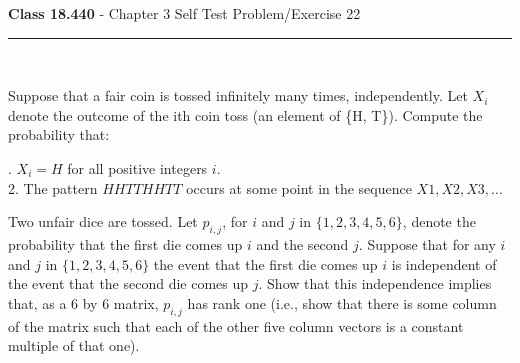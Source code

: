 \documentclass[11pt,reqno]{article}
\begin{document}
\vspace{15pt}
\begin{flushleft} 
\textbf{Class 18.440} - Chapter 3 Self Test Problem/Exercise 22\\
\rule{500pt}{1pt}\\
\end{flushleft} 


\noindent {} \par

Suppose that a fair coin is tossed infinitely many times, independently. Let $X_i$ denote the outcome of the ith coin toss (an element of \{H, T\}). Compute the probability that:

. $X_i = H$ for all positive integers $i$.\\
2. The pattern $HHTTHHTT$ occurs at some point in the sequence $X1,X2,X3,\ldots$ \\

\noindent {} \par

Two unfair dice are tossed. Let $p_{i,j}$, for $i$ and $j$ in $\{1, 2, 3, 4, 5, 6\}$, denote the probability that the first die comes up $i$ and the second $j$. Suppose that for any $i$ and $j$ in $\{1, 2, 3, 4, 5, 6\}$ the event that the first die comes up $i$ is independent of the event that the second die comes up $j$. Show that this independence implies that, as a 6 by 6 matrix, $p_{i,j}$ has rank one (i.e., show that there is some column of the matrix such that each of the other five column vectors is a constant multiple of that one).
\end{document}
